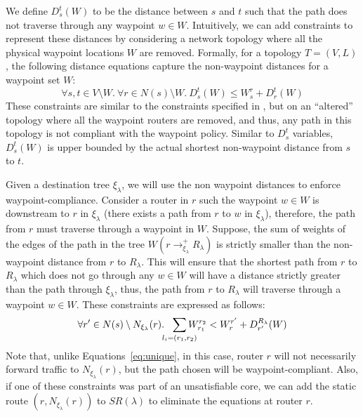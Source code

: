 We define $D_s^t(W)$ to be the 
distance between $s$ and $t$ such that the path does not
 traverse through any waypoint $w \in W$. Intuitively, we
  can add constraints to represent these distances by
  considering a network topology where all the physical 
  waypoint locations $W$ are removed. Formally, for a topology 
 $T = (V,L)$, the following distance equations 
 capture the non-waypoint distances 
 for a waypoint set $W$:
\begin{equation} \label{eq:wdistance}
\forall s, t \in V \setminus W. ~\forall r \in N(s) \setminus W.~
D_s^t(W) \leq W_s^r + D_r^t(W)
\end{equation}
These constraints are similar to the constraints specified in
, but on an ``altered'' topology where all
the waypoint routers are removed, and thus, any path in this 
topology is not compliant with the waypoint policy. 
Similar to $D_s^t$ variables, 
$D_s^t(W)$ is upper bounded by the actual shortest non-waypoint distance from $s$ to $t$.

Given a destination tree $\xi_\lambda$, we will use the non
waypoint distances to enforce waypoint-compliance. Consider a 
router in $r$ such the waypoint $w \in W$ is downstream to $r$ in $\xi_\lambda$
(there exists a path from $r$ to $w$ in $\xi_\lambda$), therefore,
the path from $r$ must traverse through 
a waypoint in $W$.  
Suppose, the sum of weights of the edges of
the path in the tree $W(r \rightarrow^+_{\xi_\lambda} R_\lambda)$  
is strictly smaller than the non-waypoint 
distance from $r$ to $R_\lambda$. This will ensure that 
the shortest path from $r$ to $R_\lambda$ which does not go through
any $w \in W$ will have a distance strictly greater than the path through
$\xi_\lambda$, thus, the path from $r$ to $R_\lambda$ will traverse
through a waypoint $w \in W$. These constraints are expressed as follows:
\begin{equation} \label{eq:waypoint}
\forall r' \in N(s) \setminus N_{\xi_\lambda}(r).~~ \sum_{\mathclap{\substack{l_i=(r_1,r_2)}}} 
W_{r_1}^{r_2} < 
W_{r}^{r'}+ D_{r'}^{R_\lambda}(W) 
\end{equation}
Note that, unlike Equations~\ref{eq:unique}, in this case, 
router $r$ will not necessarily forward traffic to  
$N_{\xi_\lambda}(r)$, but the path chosen will be waypoint-compliant. 
Also, if one of these constraints was part of an unsatisfiable  
core, we can add the static route $(r, N_{\xi_\lambda}(r))$ to
$SR(\lambda)$ to eliminate the equations at router $r$. 

